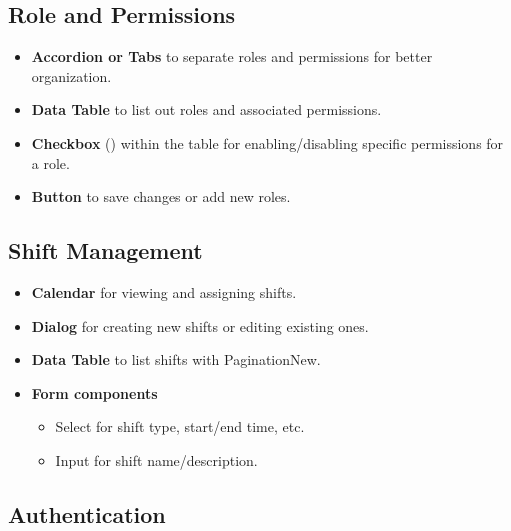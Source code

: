 \documentclass{article}
\begin{document}
\subsection{Role and Permissions}

\begin{itemize}
    \item \textbf{Accordion or Tabs} to separate roles and permissions for better organization.
    \item \textbf{Data Table} to list out roles and associated permissions.
    \item \textbf{Checkbox} (\checkmark) within the table for enabling/disabling specific permissions for a role.
    \item \textbf{Button} to save changes or add new roles.
\end{itemize}

\subsection{Shift Management}

\begin{itemize}
\item \textbf{Calendar} for viewing and assigning shifts.
\item \textbf{Dialog} for creating new shifts or editing existing ones.
\item \textbf{Data Table} to list shifts with PaginationNew.
\item \textbf{Form components}
\begin{itemize}
\item Select for shift type, start/end time, etc.
\item Input for shift name/description.
\end{itemize}
\end{itemize}

\subsection{Authentication}
\end{document}
